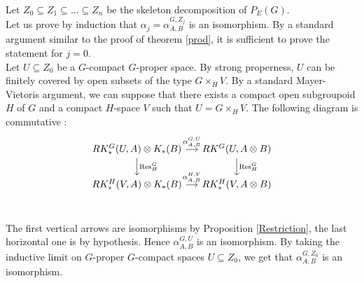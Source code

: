 
\begin{dem}
Let $Z_0\subseteq Z_1\subseteq ... \subseteq Z_n $ be the skeleton decomposition of $P_E(G)$.\\

Let us prove by induction that $\alpha_j=\alpha^{G,Z_j}_{A,B}$ is an isomorphism. By a standard argument similar to the proof of theorem \ref{prod}, it is sufficient to prove the statement for $j=0$.\\

Let $U\subseteq Z_0$ be a $G$-compact $G$-proper space. By strong properness, $U$ can be finitely covered by open subsets of the type $G \times_H V$. By a standard Mayer-Vietoris argument, we can suppose that there exists a compact open subgroupoid $H$ of $G$ and a compact $H$-space $V$ such that $U = G \times_H V$. The following diagram is commutative :
\[\begin{tikzcd}[column sep = small] 
RK_*^G(U,A)\otimes K_*(B) \arrow{r}{\alpha_{A,B}^{G,U}} \arrow{d}{\text{Res}_H^G} & RK^G(U, A\otimes B) \arrow{d}{\text{Res}_H^G}\\
RK_*^H(V, A)\otimes K_*(B) \arrow{r}{\alpha_{ A,B}^{H,V}} & 
	RK_*^H(V,  A\otimes B)\\
\end{tikzcd}\]

The first vertical arrows are isomorphisms by Proposition \ref{Restriction}, the last horizontal one is by hypothesis. Hence $\alpha_{A,B}^{G,U}$ is an isomorphism. By taking the inductive limit on $G$-proper $G$-compact spaces $U\subseteq Z_0$, we get that $\alpha_{A,B}^{G,Z_0}$ is an isomorphism.
\end{dem}

